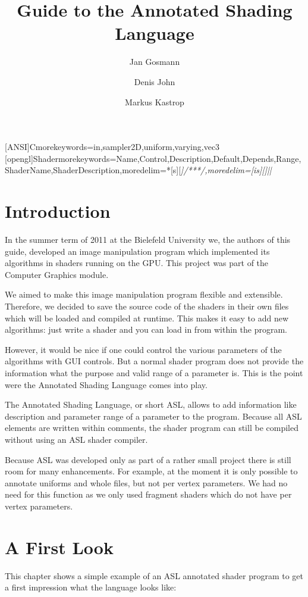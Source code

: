 \documentclass[11pt,a4paper]{scrreprt}
\title{Guide to the Annotated Shading Language}
\author{Jan Gosmann \and Denis John \and Markus Kastrop}
\begin{document}
[ANSI]{C}{morekeywords={in,sampler2D,uniform,varying,vec3}}
[opengl]{Shader}{morekeywords={Name,Control,Description,Default,Depends,Range,ShaderName,ShaderDescription},moredelim=*[s][\itshape]{/**}{*/},moredelim=[is][\itshape]{|}{|}}
\maketitle
\tableofcontents

\chapter{Introduction}
In the summer term of 2011 at the Bielefeld University we, the authors of this 
guide, developed an image manipulation program which implemented its algorithms 
in shaders running on the GPU. This project was part of the Computer Graphics 
module.

We aimed to make this image manipulation program flexible and extensible.  
Therefore, we decided to save the source code of the shaders in their own files 
which will be loaded and compiled at runtime. This makes it easy to add new 
algorithms: just write a shader and you can load in from within the program.

However, it would be nice if one could control the various parameters of the 
algorithms with GUI controls. But a normal shader program does not provide the 
information what the purpose and valid range of a parameter is. This is the 
point were the Annotated Shading Language comes into play.

The Annotated Shading Language, or short ASL, allows to add information like 
description and parameter range of a parameter to the program. Because all ASL 
elements are written within comments, the shader program can still be compiled 
without using an ASL shader compiler.

Because ASL was developed only as part of a rather small project there is still 
room for many enhancements. For example, at the moment it is only possible to 
annotate uniforms and whole files, but not per vertex parameters. We had no need 
for this function as we only used fragment shaders which do not have per vertex 
parameters.


\chapter{A First Look}
This chapter shows a simple example of an ASL annotated shader program to get 
a first impression what the language looks like:
\end{document}
